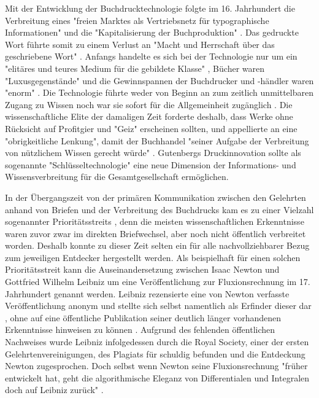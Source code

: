 Mit der Entwicklung der Buchdrucktechnologie folgte im 16. Jahrhundert die Verbreitung eines "freien Marktes als Vertriebsnetz für typographische Informationen" \cite{Giesecke_1991} und die "Kapitalisierung der Buchproduktion" \cite[:40]{Steiner_1998}. Das gedruckte Wort führte somit zu einem Verlust an "Macht und Herrschaft über das geschriebene Wort" \cite[:16]{Wunderlich_2008}. Anfangs handelte es sich bei der Technologie nur um ein "elitäres und teures Medium für die gebildete Klasse" \cite[:14]{Hartmann_2008}, Bücher waren "Luxusgegenstände" und die Gewinnspannen der Buchdrucker und -händler waren "enorm" \cite[:27]{Stober_2014}. Die Technologie führte weder von Beginn an zum zeitlich unmittelbaren Zugang zu Wissen noch war sie sofort für die Allgemeinheit zugänglich \cite{Hartmann_2008}. Die wissenschaftliche Elite der damaligen Zeit forderte deshalb, dass Werke ohne Rücksicht auf Profitgier und "Geiz" \cite{Luther_1876} erscheinen sollten, und appellierte an eine "obrigkeitliche Lenkung", damit der Buchhandel "seiner Aufgabe der Verbreitung von nützlichem Wissen gerecht würde" \cite[:102]{Wittmann_1999}. Gutenbergs Druckinnovation sollte als sogenannte "Schlüsseltechnologie" \cite[:189]{Jaeger_1993} eine neue Dimension der Informations- und Wissensverbreitung für die Gesamtgesellschaft ermöglichen.

In der Übergangszeit von der primären Kommunikation zwischen den Gelehrten anhand von Briefen und der Verbreitung des Buchdrucks kam es zu einer Vielzahl sogenannter Prioritätsstreits \cite{Schirmbacher_2009}, denn die meisten wissenschaftlichen Erkenntnisse waren zuvor zwar im direkten Briefwechsel, aber noch nicht öffentlich verbreitet worden. Deshalb konnte zu dieser Zeit selten ein für alle nachvollziehbarer Bezug zum jeweiligen Entdecker hergestellt werden. Als beispielhaft für einen solchen Prioritätsstreit kann die Auseinandersetzung zwischen Isaac Newton und Gottfried Wilhelm Leibniz um eine Veröffentlichung zur Fluxionsrechnung im 17. Jahrhundert genannt werden. Leibniz rezensierte eine von Newton verfasste Veröffentlichung anonym und stellte sich selbst namentlich als Erfinder dieser dar \cite{Leibniz_2013}, ohne auf eine öffentliche Publikation seiner deutlich länger vorhandenen Erkenntnisse hinweisen zu können \cite{Schirmbacher_2009}. Aufgrund des fehlenden öffentlichen Nachweises wurde Leibniz infolgedessen durch die Royal Society, einer der ersten Gelehrtenvereinigungen, des Plagiats für schuldig befunden und die Entdeckung Newton zugesprochen. Doch selbst wenn Newton seine Fluxionsrechnung "früher entwickelt hat, geht die algorithmische Eleganz von Differentialen und Integralen doch auf Leibniz zurück" \cite{Kittler_1996}.

